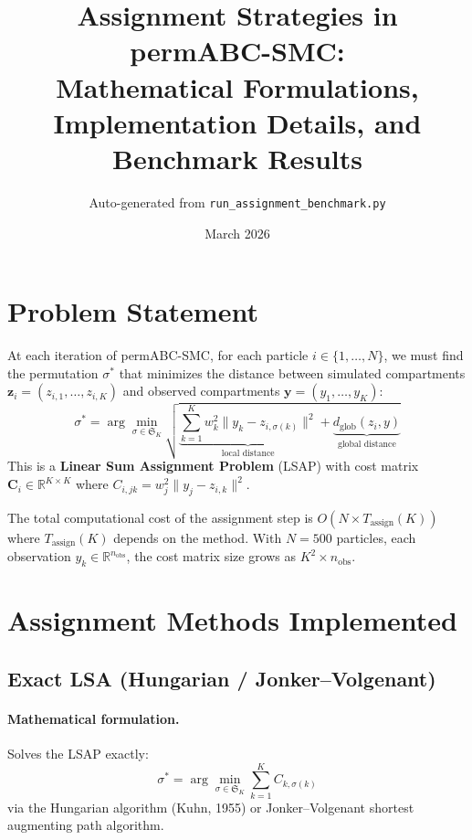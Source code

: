 \documentclass[11pt,a4paper]{article}
\title{Assignment Strategies in permABC-SMC:\\
Mathematical Formulations, Implementation Details, and Benchmark Results}
\author{Auto-generated from \texttt{run\_assignment\_benchmark.py}}
\date{March 2026}
\newcommand{\RR}{\mathbb{R}}
\newcommand{\bC}{\mathbf{C}}
\newcommand{\by}{\mathbf{y}}
\newcommand{\bz}{\mathbf{z}}
\begin{document}
\maketitle

\section{Problem Statement}

At each iteration of permABC-SMC, for each particle $i \in \{1,\dots,N\}$, we must find the permutation $\sigma^*$ that minimizes the distance between simulated compartments $\bz_i = (z_{i,1},\dots,z_{i,K})$ and observed compartments $\by = (y_1,\dots,y_K)$:
\[
  \sigma^* = \arg\min_{\sigma \in \mathfrak{S}_K}
  \sqrt{
    \underbrace{\sum_{k=1}^{K} w_k^2 \| y_k - z_{i,\sigma(k)} \|^2}_{\text{local distance}}
    + \underbrace{d_{\text{glob}}(z_i, y)}_{\text{global distance}}
  }
\]
This is a \textbf{Linear Sum Assignment Problem} (LSAP) with cost matrix $\bC_i \in \RR^{K \times K}$ where $C_{i,jk} = w_j^2 \| y_j - z_{i,k} \|^2$.

The total computational cost of the assignment step is $O(N \times T_{\text{assign}}(K))$ where $T_{\text{assign}}(K)$ depends on the method. With $N = 500$ particles, each observation $y_k \in \RR^{n_{\text{obs}}}$, the cost matrix size grows as $K^2 \times n_{\text{obs}}$.

\section{Assignment Methods Implemented}

\subsection{Exact LSA (Hungarian / Jonker--Volgenant)}
\label{sec:lsa}

\paragraph{Mathematical formulation.}
Solves the LSAP exactly:
\[
  \sigma^* = \arg\min_{\sigma \in \mathfrak{S}_K} \sum_{k=1}^K C_{k,\sigma(k)}
\]
via the Hungarian algorithm (Kuhn, 1955) or Jonker--Volgenant shortest augmenting path algorithm.
\end{document}
